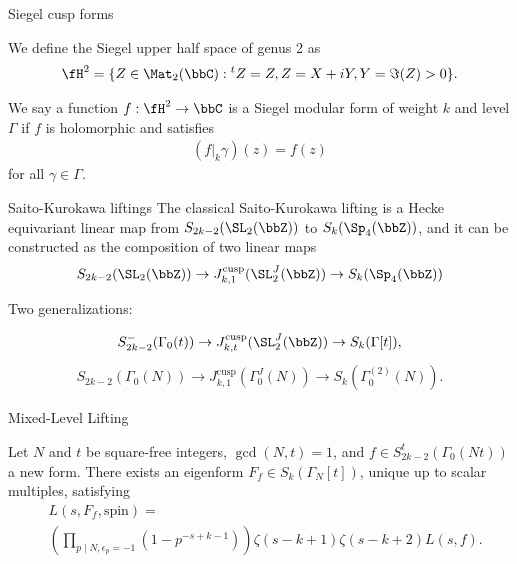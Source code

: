 \documentclass[mathserif,12pt]{beamer}
\begin{document}
\begin{frame}{Siegel cusp forms}
\begin{definition}
We define the Siegel upper half space of genus 2 as
\begin{align*}
\fH^2 = \{Z \in \Mat_2(\bbC):\, \!^tZ = Z, Z = X + i Y, Y = \Im(Z) > 0 \}.
\end{align*}
\end{definition}

\pause

\begin{definition}
We say a function $f : \fH^2 \rightarrow \bbC$ is a Siegel modular form of weight
$k$ and level $\Gamma$ if $f$ is holomorphic and satisfies
\begin{align*}
(f|_{k} \gamma)(z) = f(z)
\end{align*}
for all $\gamma \in \Gamma$.
\end{definition}
\end{frame}

\begin{frame}{Saito-Kurokawa liftings}
The classical Saito-Kurokawa lifting is a Hecke equivariant linear map from $S_{2k - 2}(\SL_2(\bbZ))$ to $S_k(\Sp_4(\bbZ))$, and it can be constructed as the
composition of two linear maps
\begin{align*}
S_{2k - 2}(\SL_2(\bbZ)) \rightarrow J_{k, 1}^{\text{cusp}}(\SL_2^J(\bbZ)) \rightarrow S_k(\Sp_4(\bbZ))
\end{align*}

\pause

Two generalizations:

\pause

\begin{align*}
S_{2k - 2}^{-} (\Gamma_0(t)) \rightarrow J_{k, t}^{\text{cusp}}(\SL_2^J(\bbZ)) \rightarrow S_k(\Gamma[t]),
\end{align*}
\pause
\begin{align*}
S_{2k - 2}(\Gamma_0(N)) \rightarrow J_{k, 1}^{\text{cusp}}(\Gamma_0^J(N)) \rightarrow S_k(\Gamma_0^{(2)}(N)).
\end{align*}
\end{frame}

\begin{frame}{Mixed-Level Lifting}
\begin{theorem}
Let $N$ and $t$ be square-free integers, $\gcd(N, t) = 1$, and $f \in S_{2k - 2}^t(\Gamma_0(Nt))$ a new form. There exists an eigenform $F_f \in S_k(\Gamma_N[t])$, unique up to scalar multiples, satisfying
\begin{align*}
& L(s, F_f, \text{spin}) = \\
& \left( \prod_{p \mid N, \epsilon_p = - 1} (1 - p^{- s + k - 1}) \right) \zeta(s - k + 1) \zeta(s - k + 2) L(s, f).
\end{align*}
\end{theorem}
\end{frame}
\end{document}
